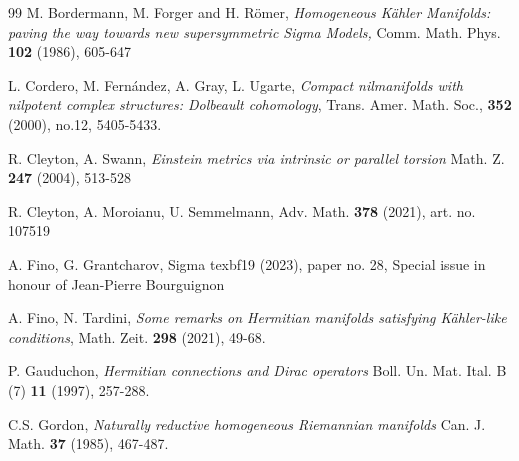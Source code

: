 \documentclass{amsart}
\numberwithin{equation}{section}
\theoremstyle{definition}
\renewcommand{\1}{\mathds{1}}
\renewcommand{\>}{\rightarrow}
\begin{document}
\begin{thebibliography}{99}
 M. Bordermann, M. Forger and H. R\"omer,
\newblock \textit{\em Homogeneous K\"ahler Manifolds: paving the way towards new supersymmetric Sigma Models,}
\newblock Comm. Math. Phys. \textbf{ 102} (1986), 605-647

 L. Cordero, M. Fern\'{a}ndez, A. Gray, L. Ugarte,
\newblock \textit{Compact nilmanifolds with nilpotent complex structures: Dolbeault cohomology},
\newblock Trans. Amer. Math. Soc., \textbf{352} (2000), no.12, 5405-5433.


 R. Cleyton, A. Swann,
\newblock\textit{Einstein metrics via intrinsic or parallel torsion}
\newblock Math. Z. \textbf{247} (2004), 513-528

 R. Cleyton, A. Moroianu, U. Semmelmann,
\newblock Adv. Math. \textbf{378} (2021), art. no. 107519

 A. Fino, G. Grantcharov,
\newblock Sigma texbf{19} (2023), paper no. 28, Special issue in honour of Jean-Pierre Bourguignon

 A. Fino, N. Tardini,
\newblock \textit{Some remarks on Hermitian manifolds satisfying K\"ahler-like conditions},
\newblock Math. Zeit. \textbf{298} (2021), 49-68.


 P. Gauduchon,
\newblock\textit{Hermitian connections and Dirac operators}
\newblock Boll. Un. Mat. Ital. B (7) \textbf{11} (1997), 257-288.

 C.S. Gordon,
\newblock\textit{Naturally reductive homogeneous Riemannian manifolds}
\newblock Can. J. Math. \textbf{37} (1985), 467-487.



\end{thebibliography}
\end{document}
